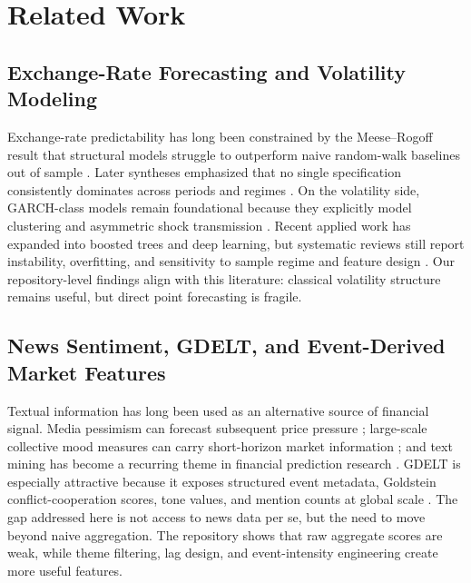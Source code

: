 \documentclass[11pt,a4paper]{article}
\begin{document}
\section{Related Work}

\subsection{Exchange-Rate Forecasting and Volatility Modeling}

Exchange-rate predictability has long been constrained by the Meese--Rogoff result that structural models struggle to outperform naive random-walk baselines out of sample \citep{meese1983}. Later syntheses emphasized that no single specification consistently dominates across periods and regimes \citep{rossi2013, engel2014}. On the volatility side, GARCH-class models remain foundational because they explicitly model clustering and asymmetric shock transmission \citep{bollerslev1986, nelson1991}. Recent applied work has expanded into boosted trees and deep learning, but systematic reviews still report instability, overfitting, and sensitivity to sample regime and feature design \citep{chen2016xgboost, sezer2020}. Our repository-level findings align with this literature: classical volatility structure remains useful, but direct point forecasting is fragile.

\subsection{News Sentiment, GDELT, and Event-Derived Market Features}

Textual information has long been used as an alternative source of financial signal. Media pessimism can forecast subsequent price pressure \citep{tetlock2007}; large-scale collective mood measures can carry short-horizon market information \citep{bollen2011}; and text mining has become a recurring theme in financial prediction research \citep{nassirtoussi2014, wu2020sentiment}. GDELT is especially attractive because it exposes structured event metadata, Goldstein conflict-cooperation scores, tone values, and mention counts at global scale \citep{leetaru2013}. The gap addressed here is not access to news data per se, but the need to move beyond naive aggregation. The repository shows that raw aggregate scores are weak, while theme filtering, lag design, and event-intensity engineering create more useful features.
\end{document}
